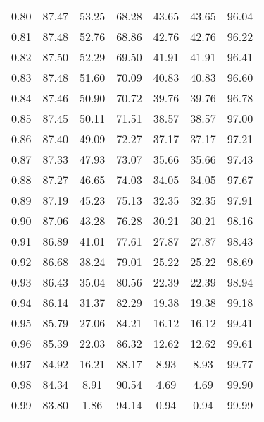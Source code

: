 \begin{tabular}{|c|c|c|c|c|c|c|}
      0.80 &     87.47 &     53.25 &      68.28 &   43.65 &      43.65 &         96.04 \\
      0.81 &     87.48 &     52.76 &      68.86 &   42.76 &      42.76 &         96.22 \\
      0.82 &     87.50 &     52.29 &      69.50 &   41.91 &      41.91 &         96.41 \\
      0.83 &     87.48 &     51.60 &      70.09 &   40.83 &      40.83 &         96.60 \\
      0.84 &     87.46 &     50.90 &      70.72 &   39.76 &      39.76 &         96.78 \\
      0.85 &     87.45 &     50.11 &      71.51 &   38.57 &      38.57 &         97.00 \\
      0.86 &     87.40 &     49.09 &      72.27 &   37.17 &      37.17 &         97.21 \\
      0.87 &     87.33 &     47.93 &      73.07 &   35.66 &      35.66 &         97.43 \\
      0.88 &     87.27 &     46.65 &      74.03 &   34.05 &      34.05 &         97.67 \\
      0.89 &     87.19 &     45.23 &      75.13 &   32.35 &      32.35 &         97.91 \\
      0.90 &     87.06 &     43.28 &      76.28 &   30.21 &      30.21 &         98.16 \\
      0.91 &     86.89 &     41.01 &      77.61 &   27.87 &      27.87 &         98.43 \\
      0.92 &     86.68 &     38.24 &      79.01 &   25.22 &      25.22 &         98.69 \\
      0.93 &     86.43 &     35.04 &      80.56 &   22.39 &      22.39 &         98.94 \\
      0.94 &     86.14 &     31.37 &      82.29 &   19.38 &      19.38 &         99.18 \\
      0.95 &     85.79 &     27.06 &      84.21 &   16.12 &      16.12 &         99.41 \\
      0.96 &     85.39 &     22.03 &      86.32 &   12.62 &      12.62 &         99.61 \\
      0.97 &     84.92 &     16.21 &      88.17 &    8.93 &       8.93 &         99.77 \\
      0.98 &     84.34 &      8.91 &      90.54 &    4.69 &       4.69 &         99.90 \\
      0.99 &     83.80 &      1.86 &      94.14 &    0.94 &       0.94 &         99.99 \\
\bottomrule
\end{tabular}

